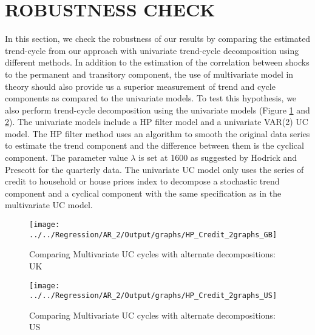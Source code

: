 \documentclass[
  12pt,
]{article}
\begin{document}
\hypertarget{robustness-check}{%
\section{ROBUSTNESS CHECK}\label{robustness-check}}

In this section, we check the robustness of our results by comparing the estimated trend-cycle from our approach with univariate trend-cycle decomposition using different methods. In addition to the estimation of the correlation between shocks to the permanent and transitory component, the use of multivariate model in theory should also provide us a superior measurement of trend and cycle components as compared to the univariate models. To test this hypothesis, we also perform trend-cycle decomposition using the univariate models (Figure \ref{fig:UKrobust} and \ref{fig:USrobust}). The univariate models include a HP filter model and a univariate VAR(2) UC model. The HP filter method uses an algorithm to smooth the original data series to estimate the trend component and the difference between them is the cyclical component. The parameter value \(\lambda\) is set at 1600 as suggested by Hodrick and Prescott for the quarterly data. The univariate UC model only uses the series of credit to household or house prices index to decompose a stochastic trend component and a cyclical component with the same specification as in the multivariate UC model.

\begin{figure}

{\centering \texttt{[image: ../../Regression/AR\_2/Output/graphs/HP\_Credit\_2graphs\_GB]} 

}

\caption{Comparing Multivariate UC cycles with alternate decompositions: UK}\label{fig:UKrobust}
\end{figure}

\begin{figure}

{\centering \texttt{[image: ../../Regression/AR\_2/Output/graphs/HP\_Credit\_2graphs\_US]} 

}

\caption{Comparing Multivariate UC cycles with alternate decompositions: US}\label{fig:USrobust}
\end{figure}

\newpage
\end{document}
